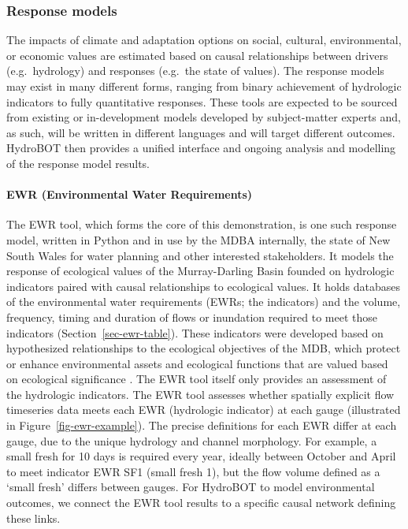 \documentclass[
  number]{elsarticle}
\let\oldparagraph\paragraph
\renewcommand{\paragraph}[1]{\oldparagraph{#1}\mbox{}}
\begin{document}
\hypertarget{sec-modules}{%
\subsubsection{Response models}\label{sec-modules}}

The impacts of climate and adaptation options on social, cultural,
environmental, or economic values are estimated based on causal
relationships between drivers (e.g.~hydrology) and responses (e.g.~the
state of values). The response models may exist in many different forms,
ranging from binary achievement of hydrologic indicators to fully
quantitative responses. These tools are expected to be sourced from
existing or in-development models developed by subject-matter experts
and, as such, will be written in different languages and will target
different outcomes. HydroBOT then provides a unified interface and
ongoing analysis and modelling of the response model results.

\hypertarget{sec-ewr}{%
\paragraph{EWR (Environmental Water Requirements)}\label{sec-ewr}}

The EWR tool, which forms the core of this demonstration, is one such
response model, written in Python and in use by the MDBA internally, the
state of New South Wales for water planning and other interested
stakeholders. It models the response of ecological values of the
Murray-Darling Basin founded on hydrologic indicators paired with causal
relationships to ecological values. It holds databases of the
environmental water requirements (EWRs; the indicators) and the volume,
frequency, timing and duration of flows or inundation required to meet
those indicators (Section~\ref{sec-ewr-table}). These indicators were
developed based on hypothesized relationships to the ecological
objectives of the MDB, which protect or enhance environmental assets and
ecological functions that are valued based on ecological significance
\citep{sheldon2024}. The EWR tool itself only provides an assessment of
the hydrologic indicators. The EWR tool assesses whether spatially
explicit flow timeseries data meets each EWR (hydrologic indicator) at
each gauge (illustrated in Figure~\ref{fig-ewr-example}). The precise
definitions for each EWR differ at each gauge, due to the unique
hydrology and channel morphology. For example, a small fresh for 10 days
is required every year, ideally between October and April to meet
indicator EWR SF1 (small fresh 1), but the flow volume defined as a
`small fresh' differs between gauges. For HydroBOT to model
environmental outcomes, we connect the EWR tool results to a specific
causal network defining these links.
\end{document}
